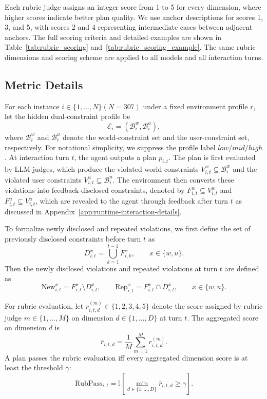 \documentclass{llmxive}
\begin{document}
Each rubric judge assigns an integer score from 1 to 5 for every dimension, where higher scores indicate better plan quality. 
We use anchor descriptions for scores 1, 3, and 5, with scores 2 and 4 representing intermediate cases between adjacent anchors. The full scoring criteria and detailed examples are shown in Table~\ref{tab:rubric_scoring} and~\ref{tab:rubric_scoring_example}.
The same rubric dimensions and scoring scheme are applied to all models and all interaction turns.

\subsection{Metric Details}
\label{app:metrics}

For each instance $i \in \{1,\dots,N\} (N=307)$ under a fixed environment profile $r$, let the hidden dual-constraint profile be
\[
\mathcal{E}_i = (\mathcal{B}_i^w, \mathcal{B}_i^u),
\]
where $\mathcal{B}_i^w$ and $\mathcal{B}_i^u$ denote the world-constraint set and the
user-constraint set, respectively. For notational simplicity, we suppress the profile label ${low}/{mid}/{high}$.
At interaction turn $t$, the agent outputs a plan $p_{i,t}$. The plan is first evaluated by LLM judges, which produce the violated world constraints $V_{i,t}^w \subseteq \mathcal{B}_i^w$ and the violated user constraints $V_{i,t}^u \subseteq \mathcal{B}_i^u$.
The environment then converts these violations into feedback-disclosed constraints, denoted by $F_{i,t}^w \subseteq V_{i,t}^w$ and $F_{i,t}^u \subseteq V_{i,t}^u$, 
which are revealed to the agent through feedback after turn $t$ as discussed in Appendix~\ref{app:runtime-interaction-details}.

To formalize newly disclosed and repeated violations, we first define the set of previously
disclosed constraints before turn $t$ as
\begin{equation}
D_{i,t}^x = \bigcup_{k=1}^{t-1} F_{i,k}^x,
\qquad x \in \{w,u\}.
\end{equation}
Then the newly disclosed violations and repeated violations at turn $t$ are defined as
\begin{equation}
\mathrm{New}_{i,t}^x = F_{i,t}^x \setminus D_{i,t}^x,
\qquad
\mathrm{Rep}_{i,t}^x = F_{i,t}^x \cap D_{i,t}^x,
\qquad x \in \{w,u\}.
\end{equation}

For rubric evaluation, let $r_{i,t,d}^{(m)} \in \{1,2,3,4,5\}$ denote the score assigned by
rubric judge $m \in \{1,\dots,M\}$ on dimension $d \in \{1,\dots,D\}$ at turn $t$.
The aggregated score on dimension $d$ is
\begin{equation}
\bar{r}_{i,t,d} = \frac{1}{M}\sum_{m=1}^{M} r_{i,t,d}^{(m)}.
\end{equation}
A plan passes the rubric evaluation iff every aggregated dimension score is at least the
threshold $\gamma$:
\begin{equation}
\mathrm{RubPass}_{i,t}
=
\mathbb{I}\!\left[
\min_{d \in \{1,\dots,D\}} \bar{r}_{i,t,d} \ge \gamma
\right].
\end{equation}
\end{document}
